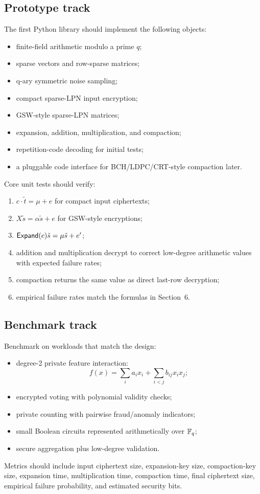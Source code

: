 \subsection{Prototype track}

The first Python library should implement the following objects:
\begin{itemize}
    \item finite-field arithmetic modulo a prime $q$;
    \item sparse vectors and row-sparse matrices;
    \item q-ary symmetric noise sampling;
    \item compact sparse-LPN input encryption;
    \item GSW-style sparse-LPN matrices;
    \item expansion, addition, multiplication, and compaction;
    \item repetition-code decoding for initial tests;
    \item a pluggable code interface for BCH/LDPC/CRT-style compaction later.
\end{itemize}

Core unit tests should verify:
\begin{enumerate}
    \item $c\cdot\tilde{t}=\mu+e$ for compact input ciphertexts;
    \item $X\tilde{s}=\alpha\tilde{s}+e$ for GSW-style encryptions;
    \item $\mathsf{Expand}(c)\tilde{s}=\mu\tilde{s}+e'$;
    \item addition and multiplication decrypt to correct low-degree arithmetic values with expected failure rates;
    \item compaction returns the same value as direct last-row decryption;
    \item empirical failure rates match the formulas in Section~6.
\end{enumerate}

\subsection{Benchmark track}

Benchmark on workloads that match the design:
\begin{itemize}
    \item degree-2 private feature interaction:
    \[
        f(x)=\sum_i a_ix_i+\sum_{i<j}b_{ij}x_ix_j;
    \]
    \item encrypted voting with polynomial validity checks;
    \item private counting with pairwise fraud/anomaly indicators;
    \item small Boolean circuits represented arithmetically over $\mathbb{F}_q$;
    \item secure aggregation plus low-degree validation.
\end{itemize}
Metrics should include input ciphertext size, expansion-key size, compaction-key size, expansion time, multiplication time, compaction time, final ciphertext size, empirical failure probability, and estimated security bits.

